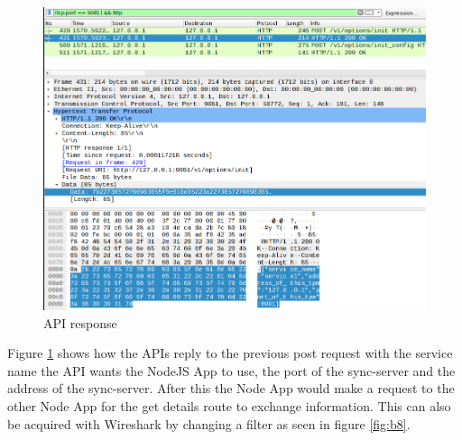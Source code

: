 \begin{figure}[!h]
  \centering
      \includegraphics[width=1\textwidth]{Figures/b5.png}
  \caption[API response]{API response}
  \label{fig:b5}
\end{figure}
\FloatBarrier
Figure \ref{fig:b5} shows how the APIs reply to the previous post request with the service name the API wants the NodeJS App to use, the port of the sync-server and the address of the sync-server.
After this the Node App would make a request to the other Node App for the get details route to exchange information. This can also be acquired with Wireshark by changing a filter as seen in figure \ref{fig:b8}.
